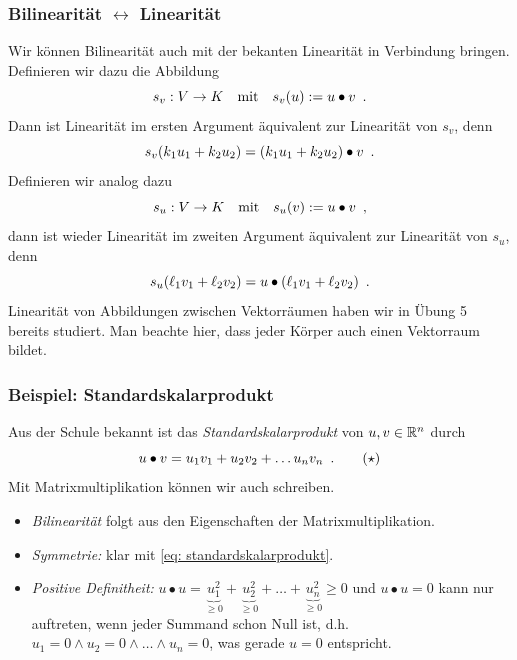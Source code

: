 \documentclass{beamer}
\begin{document}
\begin{frame} \frametitle{Bilinearität $\leftrightarrow$ Linearität}
    \justifying \small
    Wir können Bilinearität auch mit der bekanten Linearität in Verbindung bringen. Definieren wir dazu die Abbildung
    \begin{equation*}
        s_v : V \to K \quad \text{mit} \quad s_v(u) \mathrel{:=} u \bullet v \enskip \text{.}
    \end{equation*}
    Dann ist Linearität im ersten Argument äquivalent zur Linearität von $s_v$, denn
    \begin{equation*}
        s_v(k_1 u_1 + k_2 u_2) = (k_1 u_1 + k_2 u_2) \bullet v \enskip \text{.}
    \end{equation*}
    \pause
    Definieren wir analog dazu
    \begin{equation*}
        s_u : V \to K \quad \text{mit} \quad s_u(v) \mathrel{:=} u \bullet v \enskip \text{,}
    \end{equation*}
    dann ist wieder Linearität im zweiten Argument äquivalent zur Linearität von $s_u$, denn
    \begin{equation*}
        s_u(\ell_1 v_1 + \ell_2 v_2) = u \bullet (\ell_1 v_1 + \ell_2 v_2) \enskip \text{.}
    \end{equation*}
    Linearität von Abbildungen zwischen Vektorräumen haben wir in Übung 5 bereits studiert. Man beachte hier, dass jeder Körper auch einen Vektorraum bildet.
\end{frame}

\begin{frame} \frametitle{Beispiel: Standardskalarprodukt}
	\justifying \small
	Aus der Schule bekannt ist das \emph{Standardskalarprodukt} von $u,v \in \mathbb{R}^n$ durch
	\begin{equation}
		u \bullet v = u_1 v_1 + u_2 v_2 + \dots u_n v_n \enskip \text{.}
		\tag{$\star$} \label{eq: standardskalarprodukt}
	\end{equation}
	Mit Matrixmultiplikation können wir auch  schreiben.
	\begin{itemize}
		\item \emph{Bilinearität} folgt aus den Eigenschaften der Matrixmultiplikation.
		\item \emph{Symmetrie:} klar mit \eqref{eq: standardskalarprodukt}.
		\item \emph{Positive Definitheit:} $u \bullet u = \underbrace{u_1^2}_{\ge 0} + \underbrace{u_2^2}_{\ge 0} + \dots + \underbrace{u_n^2}_{\ge 0} \ge 0$ und $u \bullet u = 0$ kann nur auftreten, wenn jeder Summand schon Null ist, d.h. $u_1 = 0 \land u_2 = 0 \land \dots \land u_n = 0$, was gerade $u=0$ entspricht.
	\end{itemize}
\end{frame}
\end{document}
